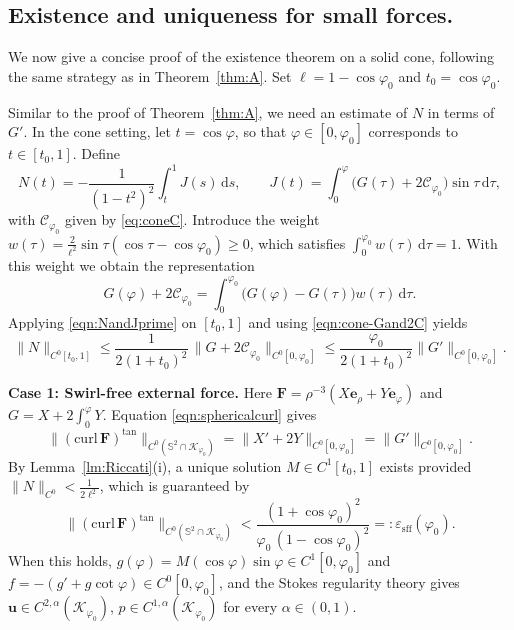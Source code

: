 \documentclass{amsart}
\newcommand{\curl}{\mathrm{curl}}
\newcommand{\vp}{\varphi}
\newcommand{\Bu}{{\boldsymbol{u}}}
\newcommand{\Be}{{\boldsymbol{e}}}
\newcommand{\BF}{{\boldsymbol{F}}}
\begin{document}
\subsection{Existence and uniqueness for small forces.}
We now give a concise proof of the existence theorem on a solid cone, following the same strategy as in Theorem~\ref{thm:A}.
Set $\ell = 1-\cos\varphi_0$ and $t_0 = \cos\varphi_0$.

Similar to the proof of Theorem~\ref{thm:A}, we need an estimate of $N$ in terms of $G'$. In the cone setting, let $t = \cos\varphi$, so that $\varphi\in[0,\varphi_0]$ corresponds to $t\in[t_0,1]$.  Define
\[
N(t) = -\frac{1}{(1-t^{2})^{2}}\int_{t}^{1} J(s)\,\mathrm{d}s,\qquad
J(t) = \int_{0}^{\varphi} \bigl(G(\tau)+2\mathcal{C}_{\varphi_0}\bigr)\sin\tau\,\mathrm{d}\tau,
\]
with $\mathcal{C}_{\varphi_0}$ given by \eqref{eq:coneC}.
Introduce the weight $w(\tau) = \frac{2}{\ell^{2}}\sin\tau(\cos\tau-\cos\varphi_0) \ge 0$, which satisfies $\int_{0}^{\varphi_0}w(\tau)\,\mathrm{d}\tau = 1$.
With this weight we obtain the representation
\begin{equation}\label{eqn:cone-Gand2C}
G(\varphi)+2\mathcal{C}_{\varphi_0} = \int_{0}^{\varphi_0} \bigl(G(\varphi)-G(\tau)\bigr) w(\tau)\,\mathrm{d}\tau .
\end{equation}
Applying \eqref{eqn:NandJprime} on $[t_{0},1]$ and using \eqref{eqn:cone-Gand2C} yields
\[
\|N\|_{C^0[t_0,1]} \le \frac{1}{2(1+t_{0})^{2}}\,\|G+2\mathcal{C}_{\varphi_0}\|_{C^{0}[0,\varphi_0]}
\le \frac{\varphi_{0}}{2(1+t_{0})^{2}}\|G'\|_{C^{0}[0,\varphi_0]} .
\]

\noindent\textbf{Case 1: Swirl-free external force.}
Here $\BF=\rho^{-3}(X\Be_\rho+Y\Be_\varphi)$ and $G=X+2\int_0^{\varphi} Y$. Equation \eqref{eqn:sphericalcurl} gives
\[
\|(\curl\,\BF)^{\tan}\|_{C^0(\mathbb{S}^{2}\cap\mathcal{K}_{\varphi_0})} = \|X'+2Y\|_{C^0[0,\varphi_0]} = \|G'\|_{C^0[0,\varphi_0]}.
\]
By Lemma~\ref{lm:Riccati}(i), a unique solution $M\in C^{1}[t_0,1]$ exists provided $\|N\|_{C^{0}}<\frac{1}{2\ell^{2}}$, which is guaranteed by
\begin{equation}\label{eqn:cone-nos-exist}
\|(\curl\,\BF)^{\tan}\|_{C^0(\mathbb{S}^{2}\cap\mathcal{K}_{\varphi_0})} < \frac{(1+\cos\varphi_0)^{2}}{\varphi_0\,(1-\cos\vp_0)^{2}} =: \varepsilon_{\mathrm{sff}}(\varphi_0).
\end{equation}
When this holds, $g(\varphi) = M(\cos\varphi)\sin\varphi \in C^1[0,\varphi_0]$ and $f = -(g' + g\cot\varphi) \in C^0[0,\varphi_0]$, and the Stokes regularity theory gives
$\Bu\in C^{2,\alpha}(\mathcal{K}_{\varphi_0})$, $p\in C^{1,\alpha}(\mathcal{K}_{\varphi_0})$ for every $\alpha \in (0,1)$.
\end{document}
